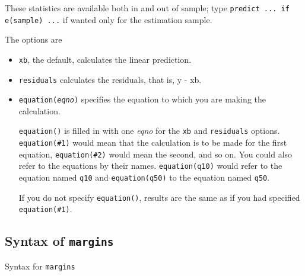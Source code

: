 \vskip 0.5cm
\noindent
These statistics are available both in and out of sample; type {\tt predict ...
if e(sample) ...} if wanted only for the estimation sample.

The options are
\begin{itemize}

\item {\tt xb}, the default, calculates the linear prediction.



\item {\tt residuals} calculates the residuals, that is, y - xb.

\item {\tt equation({\it eqno})} specifies the equation to which
you are making the calculation.

	{\tt equation()} is filled in with one {\it eqno} for the {\tt xb} and
	{\tt residuals} options.  {\tt equation(\#1)} would mean that the
	calculation is to be made for the first equation, {\tt equation(\#2)}
	would mean the second, and so on.  You could also refer to the equations
	by their names.  {\tt equation(q10)} would refer to the equation named
	{\tt q10} and {\tt equation(q50)} to the equation named {\tt q50}.

	If you do not specify {\tt equation()}, results are the same as if you
	had specified {\tt equation(\#1)}.


\end{itemize}



\subsection{Syntax of {\tt margins}}

Syntax for {\tt margins}

